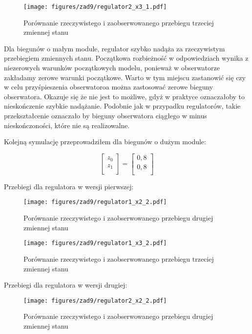 \documentclass[a4paper,titlepage,11pt,floatssmall]{mwrep}
\begin{document}
\begin{figure}[H]
\centering
\texttt{[image: figures/zad9/regulator2\_x3\_1.pdf]}
\caption{Porównanie rzeczywistego i zaobserwowanego przebiegu trzeciej zmiennej stanu}
\end{figure} 

Dla biegunów o małym module, regulator szybko nadąża za rzeczywistym przebiegiem zmiennych stanu. Początkowa rozbieżność w odpowiedziach wynika z niezerowych warunków początkowych modelu, ponieważ w obserwatorze zakładamy zerowe warunki początkowe. Warto w tym miejscu zastanowić się czy w celu przyśpieszenia obserwatoroa można zastosować zerowe bieguny obserwatora. Okazuje się że nie jest to możliwe, gdyż w praktyce oznaczałoby to nieskończenie szybkie nadążanie. Podobnie jak w przypadku regulatorów, takie przekształcenie oznaczało by bieguny obserwatora ciągłego w minus nieskończoności, które nie są realizowalne.

\newpage
\indent Kolejną symulację przeprowadziłem dla biegunów o dużym module:

\[
\begin{bmatrix}
    z_{0} \\
    z_{1} \\    
\end{bmatrix}
=
\begin{bmatrix}
    0,8 \\
    0,8 \\    
\end{bmatrix}
\]

Przebiegi dla regulatora w wersji pierwszej:
\begin{figure}[H]
\centering
\texttt{[image: figures/zad9/regulator1\_x2\_2.pdf]}
\caption{Porównanie rzeczywistego i zaobserwowanego przebiegu drugiej zmiennej stanu}
\end{figure} 

\begin{figure}[H]
\centering
\texttt{[image: figures/zad9/regulator1\_x3\_2.pdf]}
\caption{Porównanie rzeczywistego i zaobserwowanego przebiegu trzeciej zmiennej stanu}
\end{figure} 
\newpage


Przebiegi dla regulatora w wersji drugiej:
\begin{figure}[H]
\centering
\texttt{[image: figures/zad9/regulator2\_x2\_2.pdf]}
\caption{Porównanie rzeczywistego i zaobserwowanego przebiegu drugiej zmiennej stanu}
\end{figure} 
\end{document}
